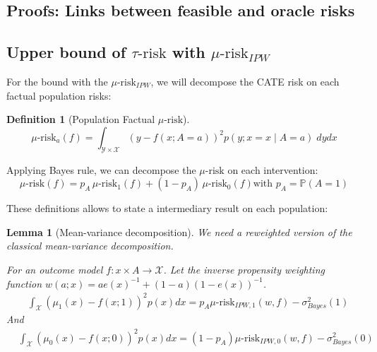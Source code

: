 \documentclass[french,12pt,twoside,a4paper]{book}
\newtheorem{definition}{Definition}
\newtheorem{lemma}{Lemma}
\begin{document}
\begin{appendices}

  \section{Proofs: Links between feasible and oracle risks}\label{apd:proofs}

  \subsection{Upper bound of $\tau\text{-risk}$ with
    $\mu\text{-risk}_{IPW}$}%
  \label{apd:proofs:mu_risk_ipw_bound}%

  For the bound with the $\mu\text{-risk}_{IPW}$, we will decompose the CATE risk
  on each factual population risks:

  \begin{definition}[Population Factual $\mu\text{-risk}$]\label{mu_risk_a}
    \citep{shalit_estimating_2017}
    \begin{equation*}
      \mu\text{-risk}_{a}(f)= \int_{\mathcal Y \times \mathcal X} (y-f(x ; A=a))^{2}  p(y ; x=x \mid A=a) \; dy dx
    \end{equation*}
  \end{definition}

  Applying Bayes rule, we can decompose the $\mu\text{-risk}$ on each
  intervention:
  \begin{equation*}
    \mu\text{-risk}(f)
    =p_{A} \,\mu\text{-risk}_{1}(f)+\left(1-p_{A}\right) \,\mu\text{-risk}_{0}(f)
    \text{with } p_A=\mathbb P(A=1)
  \end{equation*}

  These definitions allows to state a intermediary result on each population:
  \begin{lemma}[Mean-variance decomposition]\label{apd:proofs:mu_risk_ipw_link_mu}
    We need a reweighted version of the classical mean-variance decomposition.

    For an outcome model $f: x \times A \rightarrow \mathcal X$. Let the inverse
    propensity weighting function $w(a ; x)=a e(x)^{-1}+(1-a)(1-e(x))^{-1}$.
    \begin{align*}
       & \int_{\mathcal X}(\mu_{1}(x)-f(x ; 1))^{2} p(x) dx  = p_{A} \mu\text{-risk}_{IPW, 1}(w, f)  -\sigma^{2}_{Bayes}(1)
    \end{align*}
    And
    \begin{align*}
       & \int_{\mathcal X}(\mu_{0}(x)-f(x; 0))^{2} p(x) dx   = (1-p_A) \mu\text{-risk}_{IPW, 0}(w, f)  -\sigma^{2}_{Bayes}(0)
    \end{align*}


\end{lemma}
\end{appendices}
\end{document}
